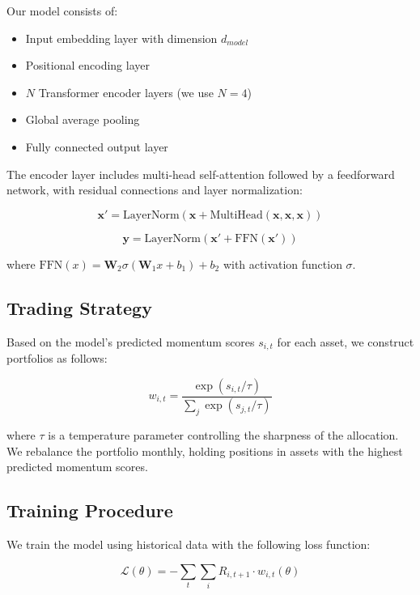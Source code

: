 \documentclass[preprint,authoryear,12pt]{elsarticle}
\begin{document}
Our model consists of:
\begin{itemize}
    \item Input embedding layer with dimension $d_{model}$
    \item Positional encoding layer
    \item $N$ Transformer encoder layers (we use $N=4$)
    \item Global average pooling
    \item Fully connected output layer
\end{itemize}

The encoder layer includes multi-head self-attention followed by a feedforward network, with residual connections and layer normalization:

\begin{equation}
\mathbf{x}' = \text{LayerNorm}(\mathbf{x} + \text{MultiHead}(\mathbf{x}, \mathbf{x}, \mathbf{x}))
\end{equation}

\begin{equation}
\mathbf{y} = \text{LayerNorm}(\mathbf{x}' + \text{FFN}(\mathbf{x}'))
\end{equation}

where $\text{FFN}(x) = \mathbf{W}_2\sigma(\mathbf{W}_1 x + b_1) + b_2$ with activation function $\sigma$.

\subsection{Trading Strategy}

Based on the model's predicted momentum scores $s_{i,t}$ for each asset, we construct portfolios as follows:

\begin{equation}
w_{i,t} = \frac{\exp(s_{i,t}/\tau)}{\sum_j \exp(s_{j,t}/\tau)}
\end{equation}

where $\tau$ is a temperature parameter controlling the sharpness of the allocation. We rebalance the portfolio monthly, holding positions in assets with the highest predicted momentum scores.

\subsection{Training Procedure}

We train the model using historical data with the following loss function:

\begin{equation}
\mathcal{L}(\theta) = -\sum_{t} \sum_{i} R_{i,t+1} \cdot w_{i,t}(\theta)
\end{equation}
\end{document}
